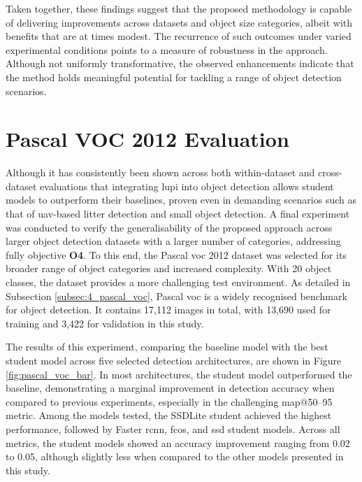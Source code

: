Taken together, these findings suggest that the proposed methodology is capable of delivering improvements across datasets and object size categories, albeit with benefits that are at times modest. The recurrence of such outcomes under varied experimental conditions points to a measure of robustness in the approach. Although not uniformly transformative, the observed enhancements indicate that the method holds meaningful potential for tackling a range of object detection scenarios.

\section{Pascal VOC 2012 Evaluation}
\label{sec:5_pascal_voc_dataset_exp}

Although it has consistently been shown across both within-dataset and cross-dataset evaluations that integrating \gls{lupi} into object detection allows student models to outperform their baselines, proven even in demanding scenarios such as that of \gls{uav}-based litter detection and small object detection. A final experiment was conducted to verify the generalisability of the proposed approach across larger object detection datasets with a larger number of categories, addressing fully objective \textbf{O4}. To this end, the Pascal \gls{voc} 2012 dataset was selected for its broader range of object categories and increased complexity. With 20 object classes, the dataset provides a more challenging test environment. As detailed in Subsection \ref{subsec:4_pascal_voc}, Pascal \gls{voc} is a widely recognised benchmark for object detection. It contains 17,112 images in total, with 13,690 used for training and 3,422 for validation in this study.

The results of this experiment, comparing the baseline model with the best student model across five selected detection architectures, are shown in Figure \ref{fig:pascal_voc_bar}. In most architectures, the student model outperformed the baseline, demonstrating a marginal improvement in detection accuracy when compared to previous experiments, especially in the challenging \gls{map}@50–95 metric. Among the models tested, the SSDLite student achieved the highest performance, followed by Faster \gls{rcnn}, \gls{fcos}, and \gls{ssd} student models. Across all metrics, the student models showed an accuracy improvement ranging from 0.02 to 0.05, although slightly less when compared to the other models presented in this study.

